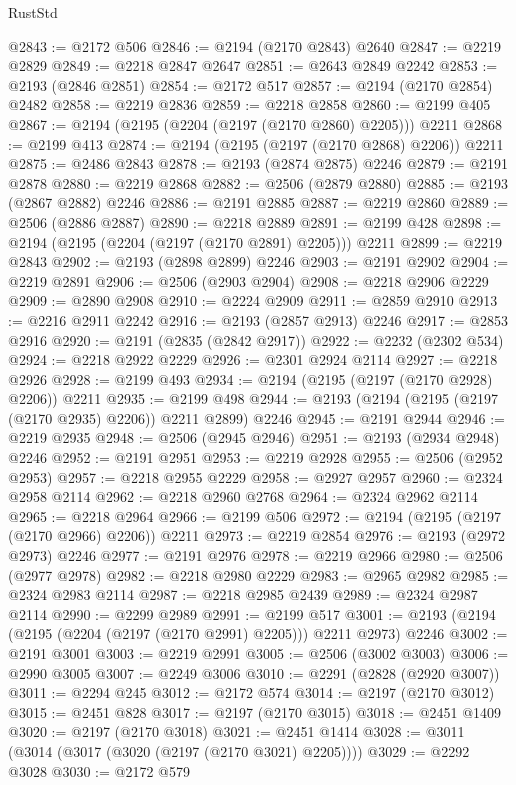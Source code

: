 \begin{lexlean}{RustStd}
\begin{coremodule}
{\begin{coremodule}
{{{{{{{{{{{{{{{{{{{{{{{{{{@2843 := @2172 @506
@2846 := @2194 (@2170 @2843) @2640
@2847 := @2219 @2829
@2849 := @2218 @2847 @2647
@2851 := @2643 @2849 @2242
@2853 := @2193 (@2846 @2851)
@2854 := @2172 @517
@2857 := @2194 (@2170 @2854) @2482
@2858 := @2219 @2836
@2859 := @2218 @2858
@2860 := @2199 @405
@2867 := @2194 (@2195 (@2204 (@2197 (@2170 @2860) @2205))) @2211
@2868 := @2199 @413
@2874 := @2194 (@2195 (@2197 (@2170 @2868) @2206)) @2211
@2875 := @2486 @2843
@2878 := @2193 (@2874 @2875) @2246
@2879 := @2191 @2878
@2880 := @2219 @2868
@2882 := @2506 (@2879 @2880)
@2885 := @2193 (@2867 @2882) @2246
@2886 := @2191 @2885
@2887 := @2219 @2860
@2889 := @2506 (@2886 @2887)
@2890 := @2218 @2889
@2891 := @2199 @428
@2898 := @2194 (@2195 (@2204 (@2197 (@2170 @2891) @2205))) @2211
@2899 := @2219 @2843
@2902 := @2193 (@2898 @2899) @2246
@2903 := @2191 @2902
@2904 := @2219 @2891
@2906 := @2506 (@2903 @2904)
@2908 := @2218 @2906 @2229
@2909 := @2890 @2908
@2910 := @2224 @2909
@2911 := @2859 @2910
@2913 := @2216 @2911 @2242
@2916 := @2193 (@2857 @2913) @2246
@2917 := @2853 @2916
@2920 := @2191 (@2835 (@2842 @2917))
@2922 := @2232 (@2302 @534)
@2924 := @2218 @2922 @2229
@2926 := @2301 @2924 @2114
@2927 := @2218 @2926
@2928 := @2199 @493
@2934 := @2194 (@2195 (@2197 (@2170 @2928) @2206)) @2211
@2935 := @2199 @498
@2944 := @2193 (@2194 (@2195 (@2197 (@2170 @2935) @2206)) @2211 @2899) @2246
@2945 := @2191 @2944
@2946 := @2219 @2935
@2948 := @2506 (@2945 @2946)
@2951 := @2193 (@2934 @2948) @2246
@2952 := @2191 @2951
@2953 := @2219 @2928
@2955 := @2506 (@2952 @2953)
@2957 := @2218 @2955 @2229
@2958 := @2927 @2957
@2960 := @2324 @2958 @2114
@2962 := @2218 @2960 @2768
@2964 := @2324 @2962 @2114
@2965 := @2218 @2964
@2966 := @2199 @506
@2972 := @2194 (@2195 (@2197 (@2170 @2966) @2206)) @2211
@2973 := @2219 @2854
@2976 := @2193 (@2972 @2973) @2246
@2977 := @2191 @2976
@2978 := @2219 @2966
@2980 := @2506 (@2977 @2978)
@2982 := @2218 @2980 @2229
@2983 := @2965 @2982
@2985 := @2324 @2983 @2114
@2987 := @2218 @2985 @2439
@2989 := @2324 @2987 @2114
@2990 := @2299 @2989
@2991 := @2199 @517
@3001 := @2193 (@2194 (@2195 (@2204 (@2197 (@2170 @2991) @2205))) @2211 @2973) @2246
@3002 := @2191 @3001
@3003 := @2219 @2991
@3005 := @2506 (@3002 @3003)
@3006 := @2990 @3005
@3007 := @2249 @3006
@3010 := @2291 (@2828 (@2920 @3007))
@3011 := @2294 @245
@3012 := @2172 @574
@3014 := @2197 (@2170 @3012)
@3015 := @2451 @828
@3017 := @2197 (@2170 @3015)
@3018 := @2451 @1409
@3020 := @2197 (@2170 @3018)
@3021 := @2451 @1414
@3028 := @3011 (@3014 (@3017 (@3020 (@2197 (@2170 @3021) @2205))))
@3029 := @2292 @3028
@3030 := @2172 @579
}}}}}}}}}}}}}}}}}}}}}}}}}}
\end{coremodule}}
\end{coremodule}
\end{lexlean}
